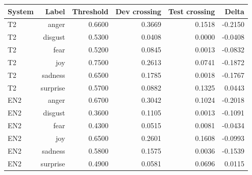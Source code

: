 \begin{tabular}{lrrrrr}
\toprule
System & Label & Threshold & Dev crossing & Test crossing & Delta \\
\midrule
T2 & anger & 0.6600 & 0.3669 & 0.1518 & -0.2150 \\
T2 & disgust & 0.5300 & 0.0408 & 0.0000 & -0.0408 \\
T2 & fear & 0.5200 & 0.0845 & 0.0013 & -0.0832 \\
T2 & joy & 0.7500 & 0.2613 & 0.0741 & -0.1872 \\
T2 & sadness & 0.6500 & 0.1785 & 0.0018 & -0.1767 \\
T2 & surprise & 0.5700 & 0.0882 & 0.1325 & 0.0443 \\
EN2 & anger & 0.6700 & 0.3042 & 0.1024 & -0.2018 \\
EN2 & disgust & 0.3600 & 0.1105 & 0.0013 & -0.1091 \\
EN2 & fear & 0.4300 & 0.0515 & 0.0081 & -0.0434 \\
EN2 & joy & 0.6500 & 0.2601 & 0.1608 & -0.0993 \\
EN2 & sadness & 0.5800 & 0.1575 & 0.0036 & -0.1539 \\
EN2 & surprise & 0.4900 & 0.0581 & 0.0696 & 0.0115 \\
\bottomrule
\end{tabular}
